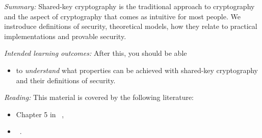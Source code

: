 \emph{Summary:}
Shared-key cryptography is the traditional approach to cryptography and the 
aspect of cryptography that comes as intuitive for most people.
We instroduce definitions of security, theoretical models, how they relate to 
practical implementations and provable security.

\emph{Intended learning outcomes:}
After this, you should be able
\begin{itemize}
  \item to \emph{understand} what properties can be achieved with shared-key 
    cryptography and their definitions of security.
\end{itemize}

\emph{Reading:}
This material is covered by the following literature:
\begin{itemize}
  \item Chapter 5 in ~\cite{Anderson2008sea},
  \item {}~\cite{EOCS}.
\end{itemize}
